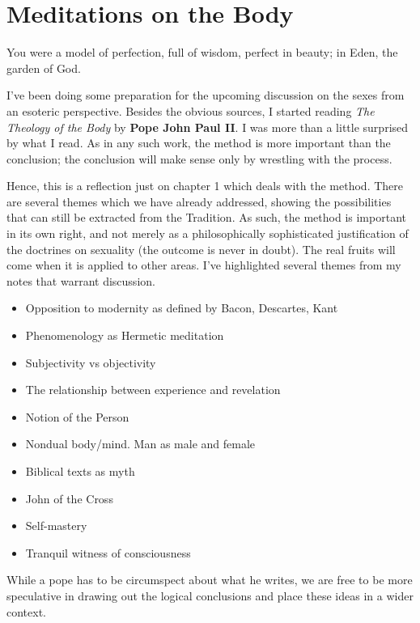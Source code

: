 \section{Meditations on the Body}

\begin{quotex}
You were a model of perfection, full of wisdom, perfect in beauty; in Eden, the garden of God. 

\end{quotex}
I've been doing some preparation for the upcoming discussion on the sexes from an esoteric perspective. Besides the obvious sources, I started reading \textit{The Theology of the Body} by \textbf{Pope John Paul II}. I was more than a little surprised by what I read. As in any such work, the method is more important than the conclusion; the conclusion will make sense only by wrestling with the process.

Hence, this is a reflection just on chapter 1 which deals with the method. There are several themes which we have already addressed, showing the possibilities that can still be extracted from the Tradition. As such, the method is important in its own right, and not merely as a philosophically sophisticated justification of the doctrines on sexuality (the outcome is never in doubt). The real fruits will come when it is applied to other areas. I've highlighted several themes from my notes that warrant discussion.

\begin{itemize}
\item Opposition to modernity as defined by Bacon, Descartes, Kant 
\item Phenomenology as Hermetic meditation 
\item Subjectivity vs objectivity 
\item The relationship between experience and revelation 
\item Notion of the Person 
\item Nondual body/mind. Man as male and female 
\item Biblical texts as myth 
\item John of the Cross 
\item Self-mastery 
\item Tranquil witness of consciousness 
\end{itemize}
While a pope has to be circumspect about what he writes, we are free to be more speculative in drawing out the logical conclusions and place these ideas in a wider context.

